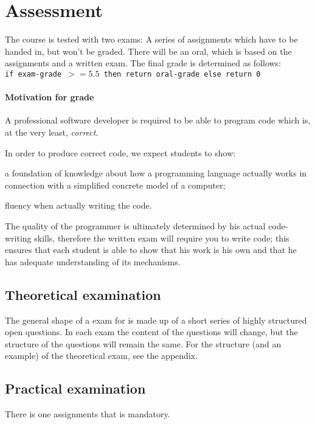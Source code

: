\section{Assessment}
The course is tested with two exams:
A series of \glspl{assignment} which have to be handed in, but won't be graded. There will be an \gls{oral}, which is based on the \glspl{assignment}
and a written exam. The final grade is determined as follows: \\

\texttt{if \gls{exam}-grade $ >= 5.5 $ then return \gls{oral}-grade else return 0}

\paragraph*{Motivation for grade}
A professional software developer is required to be able to program code which is, at the very least, \textit{correct}.

In order to produce correct code, we expect students to show:
\begin{inparaenum}
\item a foundation of knowledge about how a programming language actually works in connection with a simplified concrete model of a computer;
\item fluency when actually writing the code.
\end{inparaenum}

The quality of the programmer is ultimately determined by his actual code-writing skills, therefore the written exam will require you to write code; this ensures that each student is able to show that his work is his own and that he has adequate understanding of its mechanisms.


\subsection{Theoretical examination \modulecode}
The general shape of a \gls{exam} for \texttt{\modulecode} is made up of a short series of highly structured open questions.
In each exam the content of the questions will change, but the structure of the questions will remain the same.
For the structure (and an example) of the theoretical exam, see the appendix.


\subsection{Practical examination \modulecode}
There is one \glspl{assignment} that is mandatory.

